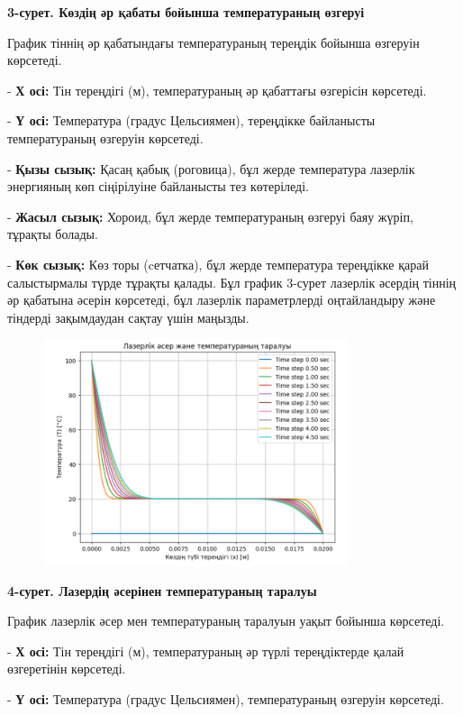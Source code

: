 {\bfseries 3-сурет. Көздің әр қабаты бойынша температураның өзгеруі}

График тіннің әр қабатындағы температураның тереңдік бойынша өзгеруін
көрсетеді.


- {\bfseries Х осі:} Тін тереңдігі (м), температураның әр қабаттағы
өзгерісін көрсетеді.

- {\bfseries Ү осі:} Температура (градус Цельсиямен), тереңдікке байланысты
температураның өзгеруін көрсетеді.

- {\bfseries Қызы сызық:} Қасаң қабық (роговица), бұл жерде температура
лазерлік энергияның көп сіңірілуіне байланысты тез көтеріледі.

- {\bfseries Жасыл сызық:} Хороид, бұл жерде температураның өзгеруі баяу
жүріп, тұрақты болады.

- {\bfseries Көк сызық:} Көз торы (cетчатка), бұл жерде температура
тереңдікке қарай салыстырмалы түрде тұрақты қалады.
Бұл график 3-сурет лазерлік әсердің тіннің әр қабатына әсерін көрсетеді,
бұл лазерлік параметрлерді оңтайландыру және тіндерді зақымдаудан сақтау
үшін маңызды.


\begin{figure}[H]
	\centering
	\includegraphics[width=0.8\textwidth]{media/ict/image23}
	\caption*{}
\end{figure}


{\bfseries 4-сурет. Лазердің әсерінен температураның таралуы}

График лазерлік әсер мен температураның таралуын уақыт бойынша
көрсетеді.


- {\bfseries Х осі:} Тін тереңдігі (м), температураның әр түрлі
тереңдіктерде қалай өзгеретінін көрсетеді.

- {\bfseries Ү осі:} Температура (градус Цельсиямен), температураның
өзгеруін көрсетеді.

